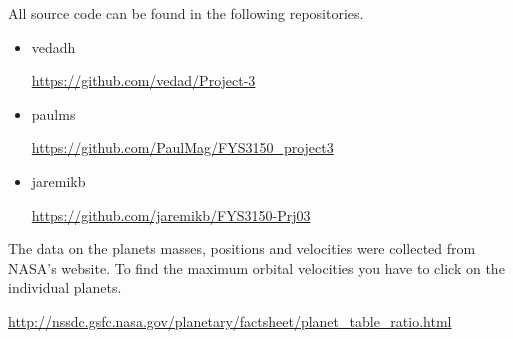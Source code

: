 All source code can be found in the following repositories.

\begin{itemize}
    \item vedadh

        \url{https://github.com/vedad/Project-3}
    \item paulms

        \url{https://github.com/PaulMag/FYS3150_project3}
    \item jaremikb

        \url{https://github.com/jaremikb/FYS3150-Prj03}
\end{itemize}

The data on the planets masses, positions and velocities were
collected from NASA's website. To find the maximum orbital
velocities you have to click on the individual planets.

\url{http://nssdc.gsfc.nasa.gov/planetary/factsheet/planet_table_ratio.html}
